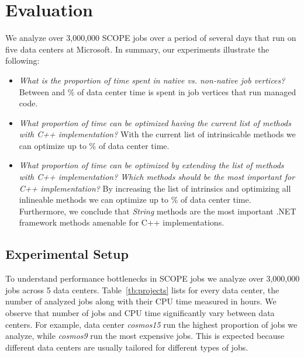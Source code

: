 \section{Evaluation}
We analyze over 3,000,000 SCOPE jobs over a period of several days that run on five data centers at Microsoft. 
In summary, our experiments illustrate the following:

\begin{itemize}
\item \emph{What is the proportion of time spent in native vs. non-native job vertices?}
Between \nonNativeTimeL{} and \nonNativeTimeU \% of data center time is spent in job vertices that run managed code.

\item \emph{What proportion of time can be optimized having the current list of methods with C++ implementation?} 
With the current list of intrinsicable methods we can optimize up to \optimizableU{} \% of data center time.

\item \emph{What proportion of time can be optimized by extending the list of methods with C++ implementation? 
Which methods should be the most important for C++ implementation?}
By increasing the list of intrinsics and optimizing all inlineable methods we can optimize up to \potentiallyOptimizableU{} \% of data center time. 
Furthermore, we conclude that \emph{String} methods are the most important .NET framework methods amenable for C++ implementations.


\end{itemize}

\subsection{Experimental Setup}
To understand performance bottlenecks in SCOPE jobs we analyze over 3,000,000 jobs across 5 data centers.
Table~\ref{tb:projects} lists for every data center, the number of analyzed jobs along with their CPU time measured in hours.
We observe that number of jobs and CPU time significantly vary between data centers. 
For example, data center \emph{cosmos15} run the highest proportion of jobs we analyze, while \emph{cosmos9} run the most expensive jobs. 
This is expected because different data centers are usually tailored for different types of jobs. 


